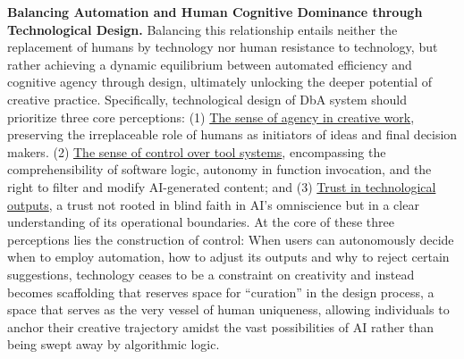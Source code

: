 \textbf{Balancing Automation and Human Cognitive Dominance through Technological Design.}
Balancing this relationship entails neither the replacement of humans by technology nor human resistance to technology, but rather achieving a dynamic equilibrium between automated efficiency and cognitive agency through design\cite{hsueh2024counts, khanolkar2023mapping}, ultimately unlocking the deeper potential of creative practice. Specifically, technological design of DbA system should prioritize three core perceptions: (1) \underline{The sense of agency in creative work}, preserving the irreplaceable role of humans as initiators of ideas and final decision makers. (2) \underline{The sense of control over tool systems}, encompassing the comprehensibility of software logic, autonomy in function invocation, and the right to filter and modify AI-generated content; and (3) \underline{Trust in technological outputs}, a trust not rooted in blind faith in AI’s omniscience but in a clear understanding of its operational boundaries. At the core of these three perceptions lies the construction of control: When users can autonomously decide when to employ automation, how to adjust its outputs and why to reject certain suggestions, technology ceases to be a constraint on creativity and instead becomes scaffolding that reserves space for ``curation''\cite{rehm2017designing, frich2019mapping, chung2021intersection} in the design process, a space that serves as the very vessel of human uniqueness, allowing individuals to anchor their creative trajectory amidst the vast possibilities of AI rather than being swept away by algorithmic logic.  

